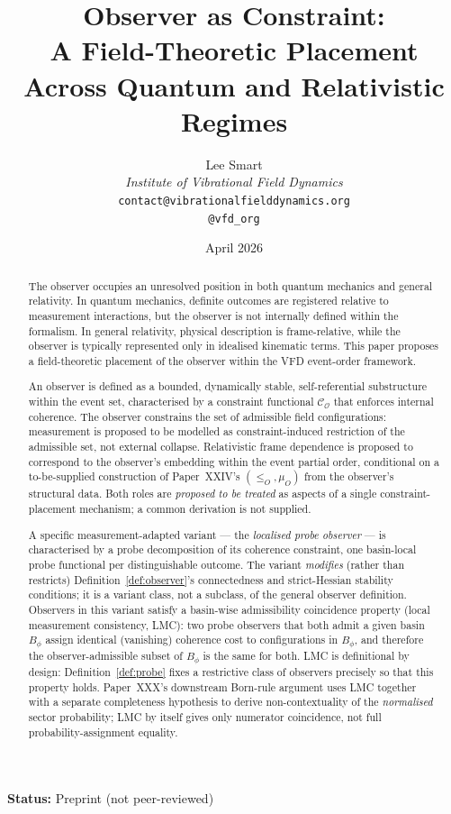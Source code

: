 \documentclass[12pt]{article}
\title{Observer as Constraint:\\[6pt]
\large A Field-Theoretic Placement Across Quantum and Relativistic Regimes}
\author{%
  Lee Smart\\[4pt]
  \textit{Institute of Vibrational Field Dynamics}\\[2pt]
  \texttt{contact@vibrationalfielddynamics.org}\\[2pt]
  \texttt{@vfd\_org}%
}
\date{April 2026}
\newcommand{\Ocal}{\mathcal{O}}
\newcommand{\Ccal}{\mathcal{C}}
\begin{document}
\maketitle

\noindent\textbf{Status:} Preprint (not peer-reviewed)

\begin{abstract}
The observer occupies an unresolved position in both quantum mechanics and general relativity. In quantum mechanics, definite outcomes are registered relative to measurement interactions, but the observer is not internally defined within the formalism. In general relativity, physical description is frame-relative, while the observer is typically represented only in idealised kinematic terms. This paper proposes a field-theoretic placement of the observer within the VFD event-order framework.

An observer is defined as a bounded, dynamically stable, self-referential substructure within the event set, characterised by a constraint functional $\Ccal_\Ocal$ that enforces internal coherence. The observer constrains the set of admissible field configurations: measurement is proposed to be modelled as constraint-induced restriction of the admissible set, not external collapse. Relativistic frame dependence is proposed to correspond to the observer's embedding within the event partial order, conditional on a to-be-supplied construction of Paper~XXIV's $(\leq_O, \mu_O)$ from the observer's structural data. Both roles are \emph{proposed to be treated} as aspects of a single constraint-placement mechanism; a common derivation is not supplied.

A specific measurement-adapted variant --- the \emph{localised probe observer} --- is characterised by a probe decomposition of its coherence constraint, one basin-local probe functional per distinguishable outcome. The variant \emph{modifies} (rather than restricts) Definition~\ref{def:observer}'s connectedness and strict-Hessian stability conditions; it is a variant class, not a subclass, of the general observer definition. Observers in this variant satisfy a basin-wise admissibility coincidence property (local measurement consistency, LMC): two probe observers that both admit a given basin $B_\phi$ assign identical (vanishing) coherence cost to configurations in $B_\phi$, and therefore the observer-admissible subset of $B_\phi$ is the same for both. LMC is definitional by design: Definition~\ref{def:probe} fixes a restrictive class of observers precisely so that this property holds. Paper~XXX's downstream Born-rule argument uses LMC together with a separate completeness hypothesis to derive non-contextuality of the \emph{normalised} sector probability; LMC by itself gives only numerator coincidence, not full probability-assignment equality.


\end{abstract}
\end{document}
